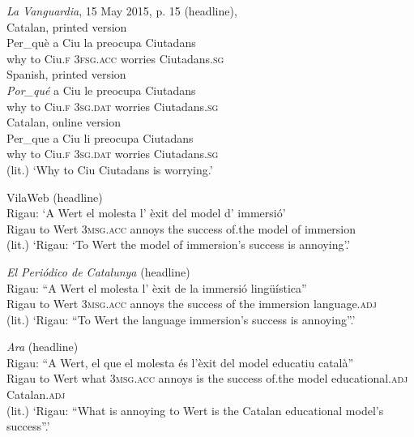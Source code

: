 \documentclass[output=paper,colorlinks,citecolor=brown,nonflat,modfonts]{langsci/langscibook}
\begin{document}
\ea%
 \emph{La} \emph{Vanguardia}, 15 May 2015, p. 15 (headline), 
 \label{ex:royo:5}\\
 \ea Catalan, printed version \label{ex:royo:5a}\\
 \gll Per\_què a Ciu la preocupa Ciutadans \\
why      to Ciu.\textsc{f} 3\textsc{fsg.acc} worries   Ciutadans.\textsc{sg} \\
 
 
 \ex Spanish, printed version \label{ex:royo:5b}\\
 \gll \emph{Por\_qué} a Ciu le preocupa Ciutadans\\
why      to Ciu.\textsc{f} \textsc{3sg.dat} worries    Ciutadans.\textsc{sg}\\
 
 
\ex Catalan, online version \label{ex:royo:5c}\\
 \gll Per\_que a Ciu li preocupa Ciutadans \\
	why      to Ciu.\textsc{f} 3\textsc{sg.dat} worries    Ciutadans.\textsc{sg}\\
 \glt (lit.) ‘Why to Ciu Ciutadans is worrying.’
 
 \z
 \z


\ea%
 \label{ex:royo:6}
 \ea VilaWeb (headline)\\
 \gll Rigau: ‘A Wert el molesta l’ èxit del model d’ immersió’\\
Rigau   to Wert \textsc{3msg.acc} annoys   the success of.the model of immersion\\
 \glt (lit.) ‘Rigau: ‘To Wert the model of immersion’s success is annoying’.’
 
 \ex \textit{El Periódico de Catalunya} (headline)\\
 \gll Rigau: “A Wert el molesta l’ èxit de la immersió lingüística”\\
 Rigau   to Wert 3\textsc{msg.acc} annoys  the success of the immersion language.\textsc{adj}\\
 \glt (lit.) ‘Rigau: “To Wert the language immersion’s success is annoying”.’
 
 \ex \textit{Ara} (headline)\\
 \gll Rigau: “A Wert, el que el molesta és l’èxit del model educatiu català”\\
Rigau    to Wert what   \textsc{3msg.acc} annoys  is the success of.the model educational.\textsc{adj} Catalan.\textsc{adj}\\
 \glt (lit.) ‘Rigau: “What is annoying to Wert is the Catalan educational model’s success”.’ 
 \z
 \z
{}
\end{document}
